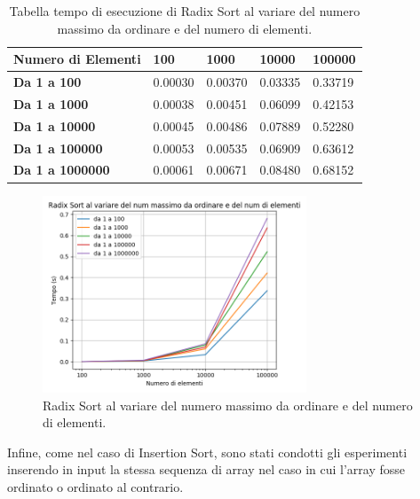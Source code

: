 \documentclass[a4paper]{article}
\begin{document}
\begin{center}
\begin{table}[h!]
\centering
\begin{tabular}{|l|l|l|l|l|}

\hline
\textbf{Numero di Elementi} & \textbf{100} & \textbf{1000} & \textbf{10000} & \textbf{100000}\\
\hline
\textbf{Da 1 a 100} & 0.00030 & 0.00370 & 0.03335 & 0.33719\\
\hline
\textbf{Da 1 a 1000} & 0.00038 & 0.00451 & 0.06099 & 0.42153\\
\hline
\textbf{Da 1 a 10000} & 0.00045 & 0.00486 & 0.07889 & 0.52280\\
\hline
\textbf{Da 1 a 100000} & 0.00053 & 0.00535 & 0.06909 & 0.63612\\
\hline
\textbf{Da 1 a 1000000} & 0.00061 & 0.00671 & 0.08480 & 0.68152\\
\hline
\end{tabular}
\caption{Tabella tempo di esecuzione di Radix Sort al variare del numero massimo da ordinare e del numero di elementi.}
\end{table}
\end{center}

\begin{figure}[h]
    \centering
    \captionsetup{justification=centering,margin=1.0cm}
    \includegraphics[width=0.7\textwidth]{RS_NumMax_NumElem}
    \caption{Radix Sort al variare del numero massimo da ordinare e del numero di elementi.}
    \label{fig:test2_1}
\end{figure}

Infine, come nel caso di Insertion Sort, sono stati condotti gli esperimenti inserendo in input la stessa sequenza di array nel caso in cui l'array fosse ordinato o ordinato al contrario.
\end{document}
